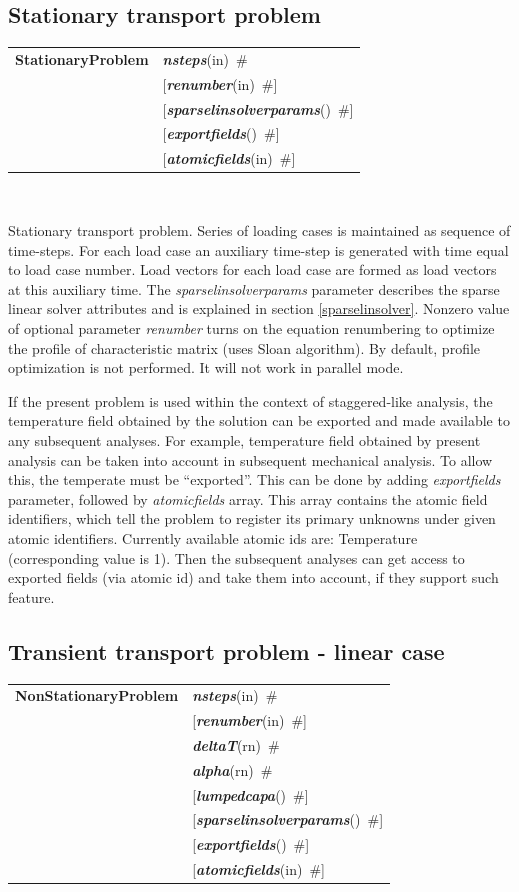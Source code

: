 \documentclass[a4paper]{article}
\makeatletter
\newcommand{\param}[1]{{\em #1}}
\newcommand{\keywordnotype}[1]{\mbox{{\it{\bf{#1}}}}}
\newcommand{\keyword}[2]{\mbox{{\keywordnotype{#1}\tiny (#2)}}}
\newcommand{\entKeywordInst}[1]{\mbox{{\bf{{#1}}}}}
\newcommand{\field}[2]{\mbox{\keyword{#1}{#2}~\#}}
\newcommand{\optField}[2]{\mbox{[\field{#1}{#2}]}}
\newenvironment{record}[1][]{\begin{tabular}{|ll}}{\end{tabular}\\}
\newcommand{\recentry}[2]{{#1}&{#2}\\}
\newcounter{rcc}
\newenvironment{record}[1][\textwidth]{\setcounter{rcc}{0}\begin{tabular*}{#1}{|ll@{\extracolsep{\fill}}r}}{\end{tabular*}\\}
\newcommand{\recentry}[2]{\ifthenelse{\value{rcc}>0}{&$\backslash$ \\}{\setcounter{rcc}{1}}{#1}&{#2}}
\makeatother
\begin{document}
\subsection{Stationary transport problem}
\label{StationaryTransport}

\begin{record}
\recentry{\entKeywordInst{StationaryProblem}}{\field{nsteps}{in}}
\recentry{}{\optField{renumber}{in}} \recentry{}{\optField{sparselinsolverparams}{}}
\recentry{}{\optField{exportfields}{}} \recentry{}{\optField{atomicfields}{in}}
\end{record}

Stationary transport problem.
Series of loading cases is maintained as sequence of time-steps.
For each load case an auxiliary time-step is generated with time
equal to load case number.
Load vectors for each load case are formed as load vectors at
this auxiliary time.
The  \param{sparselinsolverparams} parameter describes the sparse
linear solver attributes and is explained in section \ref{sparselinsolver}.
Nonzero value of optional parameter \param{renumber} turns on the
equation renumbering to optimize the profile of characteristic matrix
(uses Sloan algorithm). By default, profile optimization is not
performed. It will not work in parallel mode.

If the present problem is used within the context
of staggered-like analysis, the temperature field obtained by the
solution can be exported and made available to any subsequent
analyses. For example, temperature field obtained by present analysis
can be taken into account in subsequent mechanical analysis.
To allow this, the temperate must be ``exported''. This can be done
by adding \param{exportfields} parameter, followed by
\param{atomicfields} array. This array contains the atomic field
identifiers, which tell the problem to register its primary unknowns
under given atomic identifiers. Currently available atomic ids are:
Temperature (corresponding value is 1).
Then the subsequent analyses can get access to exported fields (via
atomic id) and take them into account, if they support such feature.

\subsection{Transient transport problem - linear case}
\label{LinearTransientTransport}

\begin{record}
\recentry{\entKeywordInst{NonStationaryProblem}}{\field{nsteps}{in}}
\recentry{}{\optField{renumber}{in}} \recentry{}{\field{deltaT}{rn}} \recentry{}{\field{alpha}{rn}}
\recentry{}{\optField{lumpedcapa}{}} \recentry{}{\optField{sparselinsolverparams}{}}
\recentry{}{\optField{exportfields}{}} \recentry{}{\optField{atomicfields}{in}}
\end{record}
\end{document}
